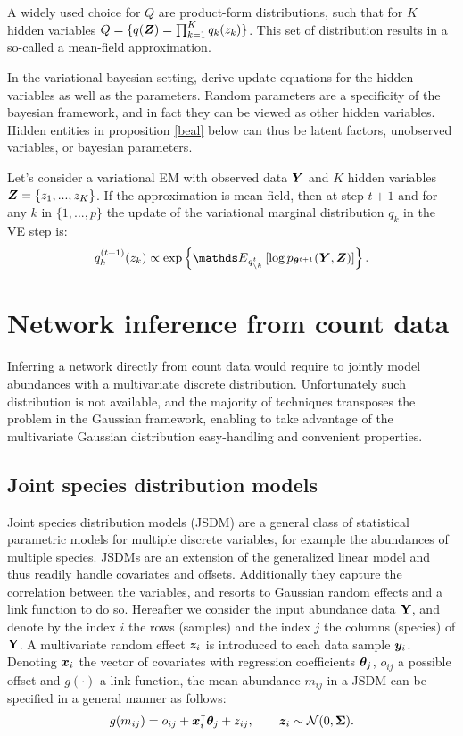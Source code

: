  A widely used choice for $Q$ are product-form distributions, such that for $K$ hidden variables $Q=\{q({\boldsymbol{Z}})=\prod_{k=1}^K q_k(z_k)\}$. This set of distribution results in a so-called a mean-field approximation. 
 
In the variational bayesian setting, \citet{beal} derive update equations  for the hidden variables as well as the parameters. Random parameters are a specificity of the bayesian framework, and in fact they can be viewed as other hidden variables. Hidden entities in proposition \ref{beal} below can thus be latent factors, unobserved variables, or bayesian parameters.

 \begin{prop}\label{beal}
 Let's consider a variational EM with observed data ${\boldsymbol{Y}}$ and $K$ hidden variables ${\boldsymbol{Z}}=\{z_1,...,z_K\}$. If the approximation is mean-field, then at step $t+1$ and for any $k$ in $\{1,...,p\}$ the update of the variational marginal distribution $q_k$ in the VE step is:
$$ q_k^{(t+1)}(z_k)  \propto \exp \left\{ \Esp_{q_{\setminus k}^t} \left[ \log p_{\thetabf^{t+1}}(\Ybf, \Zbf) \right] \right\}.$$
\end{prop}


 
\section{Network inference from count data}
  Inferring a network directly from count data would require to jointly model abundances with a multivariate discrete distribution. Unfortunately such distribution is not available, and the majority of techniques transposes the problem in the Gaussian framework, enabling to take advantage of the multivariate Gaussian distribution easy-handling and convenient properties.
  
  \subsection{Joint species distribution models}
Joint species distribution models (JSDM) are a general class of statistical parametric models for multiple discrete variables, for example the abundances of multiple species. JSDMs are an extension of the generalized linear model and thus readily handle covariates and offsets. Additionally they capture the correlation between the variables, and resorts to Gaussian random effects and a link function to do so. Hereafter we consider the input abundance data ${\bf Y}$, and denote by the index $i$ the rows (samples) and the index $j$ the columns (species) of ${\bf Y}$. A multivariate random effect ${\boldsymbol{z}}_i$ is introduced to each data sample ${\boldsymbol{y}}_i$.  Denoting ${\boldsymbol{x}}_i$ the vector of covariates with regression coefficients ${\boldsymbol{\theta}}_j$, $o_{ij}$ a possible offset  and $g(\cdot)$ a link function, the mean abundance $m_{ij}$  in a JSDM can be specified in a general manner as follows:
$$g(m_{ij}) = o_{ij}+{\boldsymbol{x}}_i^\intercal  {\boldsymbol{\theta}}_j + z_{ij}, \qquad {\boldsymbol{z}}_i \sim \mathcal{N}(0, {\boldsymbol{\Sigma}}).$$

